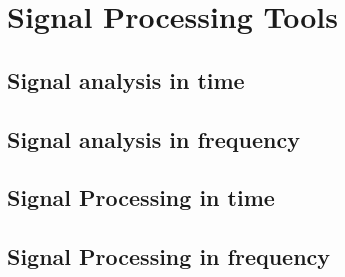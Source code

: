 \chapter{Signal Processing Tools}

\section{Signal analysis in time}

\section{Signal analysis in frequency}

\section{Signal Processing in time}

\section{Signal Processing in frequency}